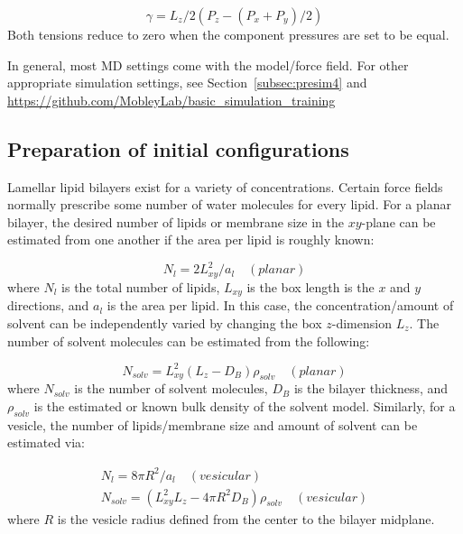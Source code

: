 \documentclass[9pt,bestpractices]{livecoms}
\begin{document}
\begin{equation}\label{eq:1}
	\gamma = L_z/2(P_z-(P_x+P_y)/2)
\end{equation}
Both tensions reduce to zero when the component pressures are set to be equal.

In general, most MD settings come with the model/force field. For other appropriate simulation settings, see Section~\ref{subsec:presim4} and \url{https://github.com/MobleyLab/basic_simulation_training}

\subsection{Preparation of initial configurations}
\label{prepconf3}
Lamellar lipid bilayers exist for a variety of concentrations.
Certain force fields normally prescribe some number of water molecules for every lipid.
For a planar bilayer, the desired number of lipids or membrane size in the $xy$-plane can be estimated from one another if the area per lipid is roughly known:

\begin{equation}\label{eq:2}
	N_l = 2 L_{xy}^2/a_l \quad (planar)
\end{equation}
where $N_l$ is the total number of lipids, $L_{xy}$ is the box length is the $x$ and $y$ directions, and $a_l$ is the area per lipid. In this case, the concentration/amount of solvent can be independently varied by changing the box $z$-dimension $L_z$. The number of solvent molecules can be estimated from the following:

\begin{equation}\label{eq:3}
	N_{solv} = L_{xy}^2 (L_z - D_B) \rho_{solv} \quad (planar)
\end{equation}
where $N_{solv}$ is the number of solvent molecules, $D_B$ is the bilayer thickness, and $\rho_{solv}$ is the estimated or known bulk density of the solvent model. Similarly, for a vesicle, the number of lipids/membrane size and amount of solvent can be estimated via:

\begin{subequations}\label{eq:4}
\begin{align}
N_l = 8 \pi R^2/a_l \quad (vesicular)\label{eq:4a} \\
N_{solv} = (L_{xy}^2 L_z - 4\pi R^2 D_B) \rho_{solv} \quad (vesicular)\label{eq:4b}
\end{align}
\end{subequations}
where $R$ is the vesicle radius defined from the center to the bilayer midplane.
\end{document}
